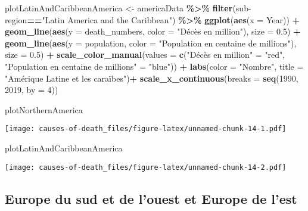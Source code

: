 \documentclass[
]{article}
\newenvironment{Shaded}{\begin{snugshade}}{\end{snugshade}}
\newcommand{\AttributeTok}[1]{\textcolor[rgb]{0.13,0.29,0.53}{#1}}
\newcommand{\DecValTok}[1]{\textcolor[rgb]{0.00,0.00,0.81}{#1}}
\newcommand{\FloatTok}[1]{\textcolor[rgb]{0.00,0.00,0.81}{#1}}
\newcommand{\FunctionTok}[1]{\textcolor[rgb]{0.13,0.29,0.53}{\textbf{#1}}}
\newcommand{\NormalTok}[1]{#1}
\newcommand{\OtherTok}[1]{\textcolor[rgb]{0.56,0.35,0.01}{#1}}
\newcommand{\SpecialCharTok}[1]{\textcolor[rgb]{0.81,0.36,0.00}{\textbf{#1}}}
\newcommand{\StringTok}[1]{\textcolor[rgb]{0.31,0.60,0.02}{#1}}
\begin{document}
\begin{Shaded}
\begin{Highlighting}[]
\NormalTok{plotLatinAndCaribbeanAmerica }\OtherTok{\textless{}{-}}\NormalTok{ americaData }\SpecialCharTok{\%\textgreater{}\%}
  \FunctionTok{filter}\NormalTok{(}\StringTok{\textasciigrave{}}\AttributeTok{sub{-}region}\StringTok{\textasciigrave{}}\SpecialCharTok{==}\StringTok{"Latin America and the Caribbean"}\NormalTok{) }\SpecialCharTok{\%\textgreater{}\%}
  \FunctionTok{ggplot}\NormalTok{(}\FunctionTok{aes}\NormalTok{(}\AttributeTok{x =}\NormalTok{ Year)) }\SpecialCharTok{+} 
  \FunctionTok{geom\_line}\NormalTok{(}\FunctionTok{aes}\NormalTok{(}\AttributeTok{y =}\NormalTok{ death\_numbers, }\AttributeTok{color =} \StringTok{"Décès en million"}\NormalTok{), }\AttributeTok{size =} \FloatTok{0.5}\NormalTok{) }\SpecialCharTok{+}
  \FunctionTok{geom\_line}\NormalTok{(}\FunctionTok{aes}\NormalTok{(}\AttributeTok{y =}\NormalTok{ population, }\AttributeTok{color =} \StringTok{"Population en centaine de millions"}\NormalTok{), }\AttributeTok{size =} \FloatTok{0.5}\NormalTok{) }\SpecialCharTok{+}
  \FunctionTok{scale\_color\_manual}\NormalTok{(}\AttributeTok{values =} \FunctionTok{c}\NormalTok{(}\StringTok{"Décès en million"} \OtherTok{=} \StringTok{"red"}\NormalTok{, }\StringTok{"Population en centaine de millions"} \OtherTok{=} \StringTok{"blue"}\NormalTok{)) }\SpecialCharTok{+}
  \FunctionTok{labs}\NormalTok{(}\AttributeTok{color =} \StringTok{"Nombre"}\NormalTok{, }\AttributeTok{title =} \StringTok{"Amérique Latine et les caraïbes"}\NormalTok{)}\SpecialCharTok{+}
  \FunctionTok{scale\_x\_continuous}\NormalTok{(}\AttributeTok{breaks =} \FunctionTok{seq}\NormalTok{(}\DecValTok{1990}\NormalTok{, }\DecValTok{2019}\NormalTok{, }\AttributeTok{by =} \DecValTok{4}\NormalTok{))}


\NormalTok{plotNorthernAmerica}
\end{Highlighting}
\end{Shaded}

\texttt{[image: causes-of-death\_files/figure-latex/unnamed-chunk-14-1.pdf]}

\begin{Shaded}
\begin{Highlighting}[]
\NormalTok{plotLatinAndCaribbeanAmerica}
\end{Highlighting}
\end{Shaded}

\texttt{[image: causes-of-death\_files/figure-latex/unnamed-chunk-14-2.pdf]}

\hypertarget{europe-du-sud-et-de-louest-et-europe-de-lest}{%
\subsection{Europe du sud et de l'ouest et Europe de
l'est}\label{europe-du-sud-et-de-louest-et-europe-de-lest}}
\end{document}
